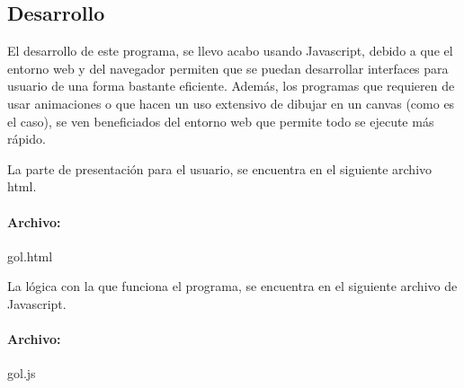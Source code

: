 \subsection{Desarrollo}
	El desarrollo de este programa, se llevo acabo usando Javascript, debido a que el entorno web y del navegador permiten que se puedan desarrollar interfaces para usuario de una forma bastante eficiente. Además, los programas que requieren de usar animaciones o que hacen un uso extensivo de dibujar en un canvas (como es el caso), se ven beneficiados del entorno web que permite todo se ejecute más rápido.

	La parte de presentación para el usuario, se encuentra en el siguiente archivo html.

	\paragraph{Archivo: } gol.html
	
	
	La lógica con la que funciona el programa, se encuentra en el siguiente archivo de Javascript.

	\paragraph{Archivo: } gol.js
	